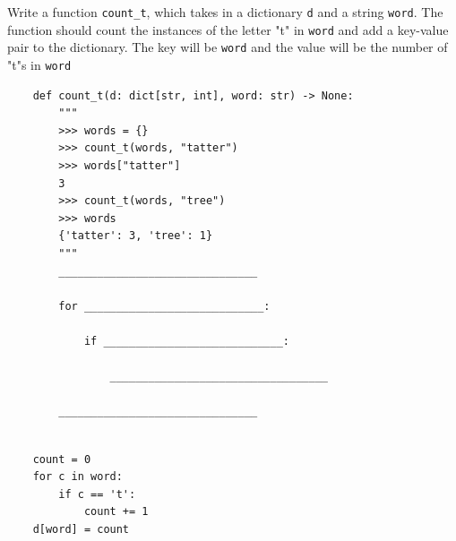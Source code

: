 \begin{blocksection}
    \question Write a function \lstinline$count_t$, which takes in a dictionary \lstinline$d$ and a string \lstinline$word$.
    The function should count the instances of the letter "t" in \lstinline$word$ and add a key-value pair to the dictionary.
    The key will be \lstinline$word$ and the value will be the number of "t"s in \lstinline$word$
    
    \begin{lstlisting}
    def count_t(d: dict[str, int], word: str) -> None:
        """
        >>> words = {}
        >>> count_t(words, "tatter")
        >>> words["tatter"]
        3
        >>> count_t(words, "tree")
        >>> words
        {'tatter': 3, 'tree': 1}
        """
        _______________________________
        
        for ____________________________:
    
            if ____________________________:
    
                __________________________________
    
        _______________________________
    
    \end{lstlisting}
    
    \begin{solution}
    \begin{lstlisting}
    count = 0
    for c in word:
        if c == 't':
            count += 1
    d[word] = count
    \end{lstlisting}
    \end{solution}
    
\end{blocksection}

